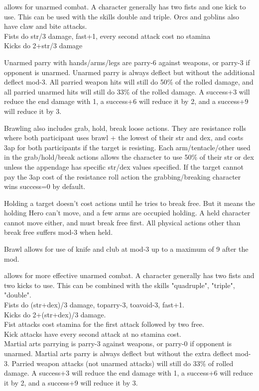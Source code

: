  allows for unarmed combat. A character generally has two fists and one kick to use. This can be used with the skills double and triple. Orcs and goblins also have claw and bite attacks.\\
Fists do str/3 damage, fast+1, every second attack cost no stamina \\
Kicks do 2+str/3 damage

Unarmed parry with hands/arms/legs are parry-6 against weapons, or parry-3 if opponent is unarmed. Unarmed parry is always deflect but without the additional deflect mod-3. All parried weapon hits will still do 50\% of the rolled damage, and all parried unarmed hits will still do 33\% of the rolled damage. A success+3 will reduce the end damage with 1, a success+6 will reduce it by 2, and a success+9 will reduce it by 3.

Brawling also includes grab, hold, break loose actions. They are resistance rolls where both participant uses brawl + the lowest of their str and dex, and costs 3ap for both participants if the target is resisting. 
Each arm/tentacle/other used in the grab/hold/break actions allows the character to use 50\% of their str or dex unless the appendage has specific str/dex values specified.
If the target cannot pay the 3ap cost of the resistance roll action the grabbing/breaking character wins success=0 by default.

Holding a target doesn't cost actions until he tries to break free. But it means the holding Hero can't move, and a few arms are occupied holding. A held character cannot move either, and must break free first. All physical actions other than break free suffers mod-3 when held.

Brawl allows for use of knife and club at mod-3 up to a maximum of 9 after the mod.


 allows for more effective unarmed combat. A character generally has two fists and two kicks to use. This can be combined with the skills "quadruple", "triple", "double". \\
Fists do (str+dex)/3 damage, toparry-3, toavoid-3, fast+1. \\
Kicks do 2+(str+dex)/3 damage.\\
Fist attacks cost stamina for the first attack followed by two free.\\
Kick attacks have every second attack at no stamina cost. \\
Martial arts parrying is parry-3 against weapons, or parry-0 if opponent is unarmed. Martial arts parry is always deflect but without the extra deflect mod-3. Parried weapon attacks (not unarmed attacks) will still do 33\% of rolled damage. A success+3 will reduce the end damage with 1, a success+6 will reduce it by 2, and a success+9 will reduce it by 3.

